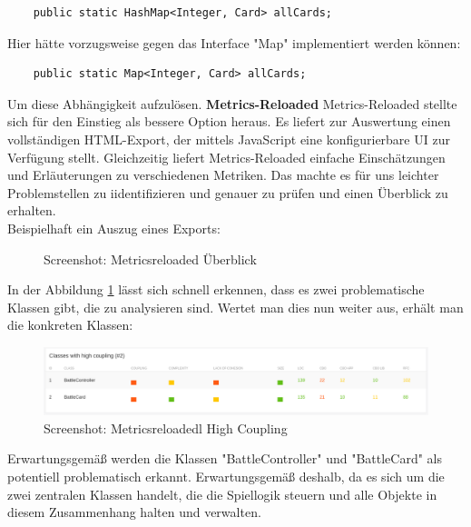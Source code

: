 \begin{lstlisting}
	public static HashMap<Integer, Card> allCards;
\end{lstlisting}
Hier hätte vorzugsweise gegen das Interface "Map" implementiert werden können:
\begin{lstlisting}
	public static Map<Integer, Card> allCards;
\end{lstlisting}
Um diese Abhängigkeit aufzulösen.
\textbf{Metrics-Reloaded}
Metrics-Reloaded stellte sich für den Einstieg als bessere Option heraus. Es liefert zur Auswertung einen vollständigen HTML-Export, der mittels JavaScript eine konfigurierbare UI zur Verfügung stellt. Gleichzeitig liefert Metrics-Reloaded einfache Einschätzungen und Erläuterungen zu verschiedenen Metriken. Das machte es für uns leichter Problemstellen zu iidentifizieren und genauer zu prüfen und einen Überblick zu erhalten.\\
Beispielhaft ein Auszug eines Exports:
\begin{figure}[h]
\centering
\qquad
\caption{Screenshot: Metricsreloaded Überblick}%
 \label{fig: Screenshot Metricsreloaded Überblick}%
\end{figure}
In der Abbildung \ref{fig: Screenshot Metricsreloaded Überblick} lässt sich schnell erkennen, dass es zwei problematische Klassen gibt, die zu analysieren sind.
Wertet man dies nun weiter aus, erhält man die konkreten Klassen:
\begin{figure}
\includegraphics[width=1\textwidth]{../img/sq/metricsreloaded3.PNG}
\caption{Screenshot: Metricsreloadedl High Coupling}
\label{fig:Screenshot Metricsreloaded High Coupling}
\end{figure}
Erwartungsgemäß werden die Klassen "BattleController" und "BattleCard" als potentiell problematisch erkannt. Erwartungsgemäß deshalb, da es sich um die zwei zentralen Klassen handelt, die die Spiellogik steuern und alle Objekte in diesem Zusammenhang halten und verwalten. 

